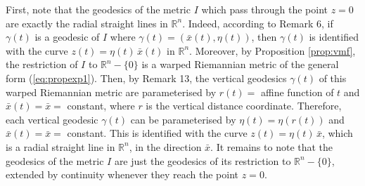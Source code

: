 \documentclass{svmult}
\begin{document}
First, note that the geodesics of the metric $I$ which pass through the point $z = 0$ are exactly the radial straight lines in $\mathbb{R}^n$. Indeed, according to Remark 6, if $\gamma(t)$ is a geodesic of $I$ where $\gamma(t) = (\bar{x}(t),\eta(t))$, then $\gamma(t)$ is identified with the curve $z(t) = \eta(t)\,\bar{x}(t)$ in $\mathbb{R}^n$. Moreover, by Proposition \ref{prop:vmf}, the restriction of $I$ to $\mathbb{R}^n - \lbrace 0 \rbrace$ is a warped Riemannian metric of the general form (\ref{eq:propexp1}). Then, by Remark 13, the vertical geodesics $\gamma(t)$ of this warped Riemannian metric are parameterised by $r(t) =$ affine function of $t$ and $\bar{x}(t) = \bar{x} =$ constant, where $r$ is the vertical distance coordinate. Therefore, each vertical geodesic $\gamma(t)$ can be parameterised by $\eta(t) = \eta(r(t))$ and $\bar{x}(t) = \bar{x} =$ constant. This is identified with the curve $z(t) = \eta(t)\,\bar{x}$, which is a radial straight line in $\mathbb{R}^n$, in the direction $\bar{x}$. It remains to note that the geodesics of the metric $I$ are just the geodesics of its restriction to $\mathbb{R}^n - \lbrace 0 \rbrace$, extended by continuity whenever they reach the point $z = 0$. 
\end{document}
